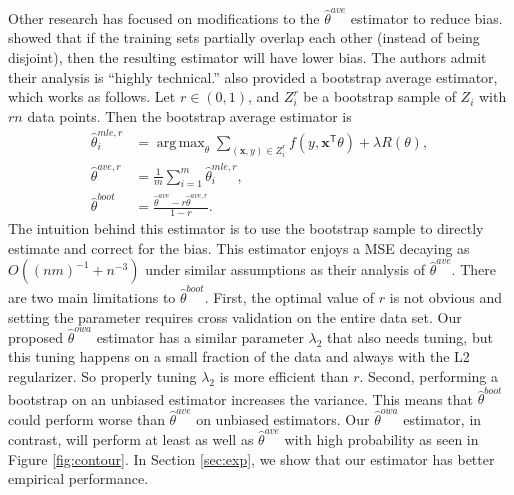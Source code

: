 \documentclass[twoside]{article}
\DeclareMathOperator*{\argmin}{arg\,min}
\DeclareMathOperator*{\argmax}{arg\,max}
\newcommand{\x}{\mathbf{x}}
\newcommand{\w}{\theta}
\newcommand{\wowa}{\hat\w^{owa}}
\newcommand{\wave}{\hat\w^{ave}}
\newcommand{\waver}{\hat\w^{ave,r}}
\newcommand{\wboot}{\hat\w^{boot}}
\newcommand{\wmle}{\hat\w^{mle}}
\newcommand{\wmler}{\hat\w^{mle,r}}
\newcommand{\trans}[1]{\ensuremath{{#1}^{\mathsf{T}}}}
\newcommand{\ltwo}[1]{{\lVert {#1} \rVert}}
\begin{document}
Other research has focused on modifications to the $\wave$ estimator to reduce bias.
\cite{zinkevich2010parallelized} showed that if the training sets partially overlap each other (instead of being disjoint), then the resulting estimator will have lower bias.
The authors admit their analysis is ``highly technical.''
\cite{zhang2012communication} also provided a bootstrap average estimator,
which works as follows.
Let $r\in(0,1)$, and $Z_i^r$ be a bootstrap sample of $Z_i$ with $rn$ data points.
Then the bootstrap average estimator is
\begin{equation}
\begin{aligned}
\wmler_i &= \argmax_\w \sum_{(\x,y)\in Z_i^r} f(y,\trans\x\w) + \lambda R(\w)
,
\\
\waver &= \frac{1}{m}\sum_{i=1}^m \wmler_i
,
\\
\wboot & = \frac{\wave-r\waver}{1-r}
.
\end{aligned}
\end{equation}
The intuition behind this estimator is to use the bootstrap sample to directly estimate and correct for the bias.
This estimator enjoys a MSE decaying as $O((nm)^{-1}+n^{-3})$ under similar assumptions as their analysis of $\wave$.
There are two main limitations to $\wboot$.
First, the optimal value of $r$ is not obvious and setting the parameter requires cross validation on the entire data set.
Our proposed $\wowa$ estimator has a similar parameter $\lambda_2$ that also needs tuning,
but this tuning happens on a small fraction of the data and always with the L2 regularizer.
So properly tuning $\lambda_2$ is more efficient than $r$.
Second, performing a bootstrap on an unbiased estimator increases the variance.
This means that $\wboot$ could perform worse than $\wave$ on unbiased estimators.
Our $\wowa$ estimator, in contrast, will perform at least as well as $\wave$ with high probability as seen in Figure \ref{fig:contour}.
In Section \ref{sec:exp}, we show that our estimator has better empirical performance.

\end{document}
